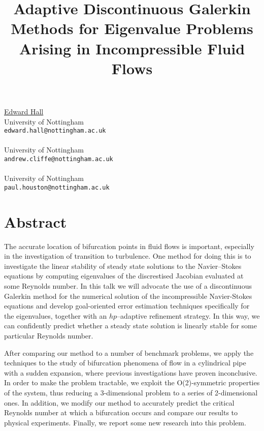\title{Adaptive Discontinuous Galerkin Methods for Eigenvalue Problems Arising in Incompressible Fluid Flows}
 \author{} \institute{}
\maketitle
\begin{center}
{\large \underline{Edward Hall}}\\
University of Nottingham\\
{\tt edward.hall@nottingham.ac.uk}
\\ \vspace{4mm}{\large K. Andrew Cliffe}\\
University of Nottingham\\
{\tt andrew.cliffe@nottingham.ac.uk}
\\ \vspace{4mm}{\large Paul Houston}\\
University of Nottingham\\
{\tt paul.houston@nottingham.ac.uk}

\end{center}

\section*{Abstract}

The accurate location of bifurcation points  in fluid flows is important, especially in the investigation of transition to turbulence. One method for doing this is to investigate the linear stability of steady state solutions to the Navier--Stokes equations  by computing eigenvalues of the discrestised Jacobian evaluated at some Reynolds number. In this talk we will advocate the use of a discontinuous Galerkin method for the numerical solution of the incompressible
Navier-Stokes equations and develop goal-oriented error estimation techniques specifically for the eigenvalues, together with an $hp$--adaptive refinement strategy. In this way, we can confidently predict whether a steady state solution is linearly stable for some particular Reynolds number.

After comparing our method to a number of benchmark problems, we apply the techniques to the study of bifurcation phenomena of flow in a cylindrical pipe with a sudden expansion, where previous investigations have proven inconclusive. In order to make the problem tractable, we exploit the O(2)-symmetric properties of the system, thus reducing a 3-dimensional problem to a series of
 2-dimensional ones. In addition, we modify our method to accurately predict the critical Reynolds number at which a bifurcation occurs and compare our results to physical experiments. Finally, we report some new research into this problem.


